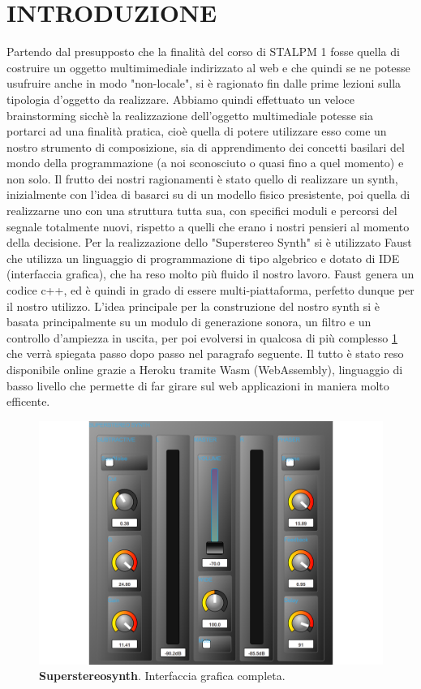 \documentclass[
	a4paper,
	twocolumn
	]{article}
\begin{document}
\maketitle
\thispagestyle{empty}
\section*{INTRODUZIONE}
Partendo dal presupposto che la finalità del corso di STALPM 1 fosse quella
di costruire un oggetto multimimediale indirizzato al web e che quindi se ne
potesse usufruire anche in modo "non-locale", si è ragionato fin dalle prime
lezioni sulla tipologia d'oggetto da realizzare. Abbiamo quindi effettuato
un veloce brainstorming sicchè la realizzazione dell'oggetto multimediale
potesse sia portarci ad una finalità pratica, cioè quella di potere utilizzare
esso come un nostro strumento di composizione, sia di apprendimento dei concetti
basilari del mondo della programmazione (a noi sconosciuto o quasi fino a quel
momento) e non solo. Il frutto dei nostri ragionamenti è stato quello di realizzare un synth,
inizialmente con l'idea di basarci su di un modello fisico presistente, poi quella di
realizzarne uno con una struttura tutta sua, con specifici moduli e percorsi del segnale
totalmente nuovi, rispetto a quelli che erano i nostri pensieri al momento della decisione.
Per la realizzazione dello "Superstereo Synth" si è utilizzato Faust \cite{faust}
che utilizza un linguaggio di programmazione di tipo algebrico e dotato di IDE (interfaccia grafica), che
ha reso molto più fluido il nostro lavoro. Faust genera un codice c++, ed è quindi in grado
di essere multi-piattaforma, perfetto dunque per il nostro utilizzo. L'idea principale per
la construzione del nostro synth si è basata principalmente su un modulo di generazione sonora, un filtro e
un controllo d'ampiezza in uscita, per poi evolversi in qualcosa di più complesso \ref{superstereosynth} che verrà spiegata passo dopo passo nel paragrafo seguente. Il tutto è stato reso disponibile online grazie
a Heroku tramite Wasm (WebAssembly), linguaggio di basso livello che permette di far girare sul web applicazioni in maniera molto efficente.

\begin{figure}[h]
\begin{center}
\includegraphics[width=.47\textwidth]{img/Superstereosynth}
\caption{\textbf{Superstereosynth}. Interfaccia grafica completa.}
\label{superstereosynth}
\end{center}
\end{figure}
\end{document}
